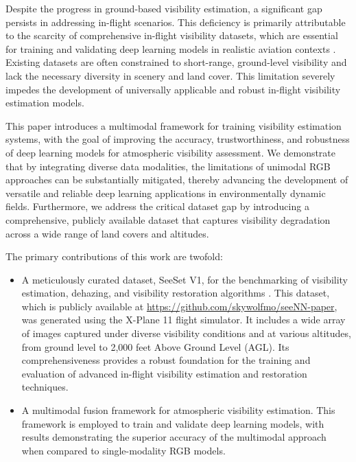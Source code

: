 Despite the progress in ground-based visibility estimation, a significant gap persists in addressing in-flight scenarios. This deficiency is primarily attributable to the scarcity of comprehensive in-flight visibility datasets, which are essential for training and validating deep learning models in realistic aviation contexts \cite{AitOuadil2023}. Existing datasets are often constrained to short-range, ground-level visibility and lack the necessary diversity in scenery and land cover. This limitation severely impedes the development of universally applicable and robust in-flight visibility estimation models.

This paper introduces a multimodal framework for training visibility estimation systems, with the goal of improving the accuracy, trustworthiness, and robustness of deep learning models for atmospheric visibility assessment. We demonstrate that by integrating diverse data modalities, the limitations of unimodal RGB approaches can be substantially mitigated, thereby advancing the development of versatile and reliable deep learning applications in environmentally dynamic fields. Furthermore, we address the critical dataset gap by introducing a comprehensive, publicly available dataset that captures visibility degradation across a wide range of land covers and altitudes.

The primary contributions of this work are twofold:
\begin{itemize}
    \item A meticulously curated dataset, SeeSet V1, for the benchmarking of visibility estimation, dehazing, and visibility restoration algorithms \cite{gui2023comprehensive}. This dataset, which is publicly available at \url{https://github.com/skywolfmo/seeNN-paper}, was generated using the X-Plane 11 flight simulator. It includes a wide array of images captured under diverse visibility conditions and at various altitudes, from ground level to 2,000 feet Above Ground Level (AGL). Its comprehensiveness provides a robust foundation for the training and evaluation of advanced in-flight visibility estimation and restoration techniques.
    
    \item A multimodal fusion framework for atmospheric visibility estimation. This framework is employed to train and validate deep learning models, with results demonstrating the superior accuracy of the multimodal approach when compared to single-modality RGB models.
\end{itemize}

